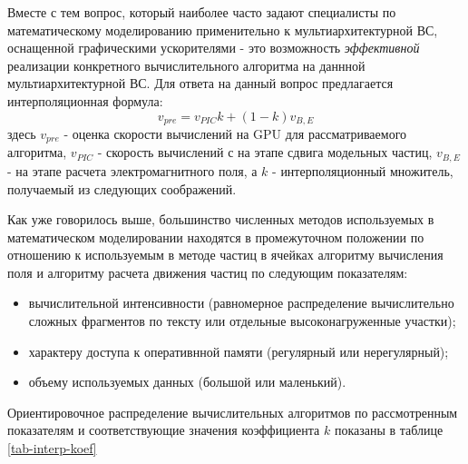 Вместе с тем вопрос, который наиболее часто задают специалисты по математическому моделированию применительно к мультиархитектурной ВС, оснащенной графическими ускорителями - это возможность \textit{эффективной} реализации конкретного вычислительного алгоритма на даннной мультиархитектурной ВС.
Для ответа на данный вопрос предлагается интерполяционная формула:
\begin{equation}
v_{pre} = v_{PIC} k + (1-k) v_{B,E}
\end{equation} 
здесь $ v_{pre}$ - оценка скорости вычислений на GPU для рассматриваемого алгоритма, $v_{PIC}$ - скорость вычислений с на этапе сдвига модельных частиц, $v_{B,E}$ - на этапе расчета электромагнитного поля, а $k$ - интерполяционный множитель, получаемый из следующих соображений.

Как уже говорилось выше, большинство численных методов используемых в математическом моделировании находятся в промежуточном положении по отношению к используемым в методе частиц в ячейках алгоритму вычисления поля и алгоритму расчета движения частиц по следующим показателям:
\begin{itemize}
	\item вычислительной интенсивности (равномерное распределение вычислительно сложных фрагментов по тексту или отдельные высоконагруженные участки);
	\item характеру доступа к оперативнной памяти (регулярный или нерегулярный);
	\item объему используемых данных (большой или маленький).
\end{itemize}
Ориентировочное распределение вычислительных алгоритмов по рассмотренным показателям и соответствующие значения коэффициента $k$ показаны в таблице \ref{tab-interp-koef}


